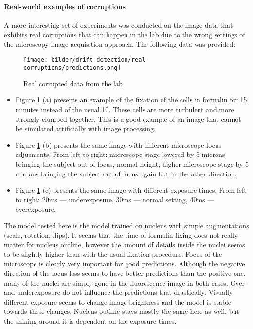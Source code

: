 \paragraph{Real-world examples of corruptions}
A more interesting set of experiments was conducted on the image data that exhibits real corruptions that can happen in the lab due to the wrong settings of the microscopy image acquisition approach. The following data was provided: 
\begin{figure}[htb]
	\begin{center}
		\texttt{[image: bilder/drift-detection/real corruptions/predictions.png]}
		\caption{Real corrupted data from the lab}\label{fig:real-corruptions-predictions}
	\end{center}
\end{figure}


\begin{itemize}
    \item Figure \ref{fig:real-corruptions-predictions} (a) presents an example of the fixation of the cells in formalin for 15 minutes instead of the usual 10. These cells are more turbulent and more strongly clumped together. This is a good example of an image that cannot be simulated artificially with image processing.
    
    \item Figure \ref{fig:real-corruptions-predictions} (b) presents the same image with different microscope focus adjusments. From left to right: microscope stage lowered by 5 microns bringing the subject out of focus, normal height, higher microscope stage by 5 microns bringing the subject out of focus again but in the other direction.
    
    \item Figure \ref{fig:real-corruptions-predictions} (c) presents the same image with different exposure times. From left to right: 20ms --- underexposure, 30ms --- normal setting, 40ms --- overexposure.
\end{itemize}

The model tested here is the model trained on nucleus with simple augmentations (scale, rotation, flips). It seems that the time of formalin fixing does not really matter for nucleus outline, however the amount of details inside the nuclei seems to be slightly higher than with the usual fixation procedure. Focus of the microscope is clearly very important for good predictions. Although the negative direction of the focus loss seems to have better predictions than the positive one, many of the nuclei are simply gone in the fluorescence image in both cases. Over- and underexposure do not influence the predictions that drastically. Visually different exposure seems to change image brightness and the model is stable towards these changes. Nucleus outline stays mostly the same here as well, but the shining around it is dependent on the exposure times.
